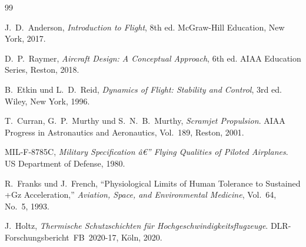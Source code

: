 ﻿\documentclass[12pt,a4paper]{article}
\theoremstyle{plain}
\theoremstyle{definition}
\theoremstyle{remark}
\begin{document}
\printnomenclature

\begin{thebibliography}{99}

J.~D.~Anderson,
\textit{Introduction to Flight}, 8th ed.
McGraw-Hill Education, New York, 2017.

D.~P.~Raymer,
\textit{Aircraft Design: A Conceptual Approach}, 6th ed.
AIAA Education Series, Reston, 2018.

B.~Etkin und L.~D.~Reid,
\textit{Dynamics of Flight: Stability and Control}, 3rd ed.
Wiley, New York, 1996.

T.~Curran, G.~P.~Murthy und S.~N.~B.~Murthy,
\textit{Scramjet Propulsion}.
AIAA Progress in Astronautics and Aeronautics, Vol.~189, Reston, 2001.

MIL-F-8785C,
\textit{Military Specification â€” Flying Qualities of Piloted Airplanes}.
US Department of Defense, 1980.

R.~Franks und J.~French,
``Physiological Limits of Human Tolerance to Sustained +Gz Acceleration,''
\textit{Aviation, Space, and Environmental Medicine}, Vol.~64, No.~5, 1993.

J.~Holtz,
\textit{Thermische Schutzschichten für Hochgeschwindigkeitsflugzeuge}.
DLR-Forschungsbericht~FB~2020-17, Köln, 2020.

\end{thebibliography}
\end{document}
